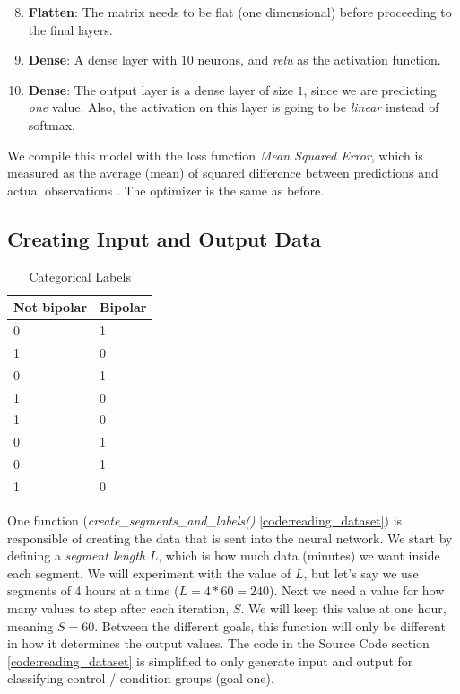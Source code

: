 \begin{enumerate}
      \setcounter{enumi}{7}
      \item \textbf{Flatten}: The matrix needs to be flat (one dimensional) before proceeding to the final layers.
      \item \textbf{Dense}: A dense layer with $10$ neurons, and \textit{relu} as the activation function. 
      \item \textbf{Dense}: The output layer is a dense layer of size $1$, since we are predicting \textit{one} value. 
            Also, the activation on this layer is going to be \textit{linear} instead of softmax.
\end{enumerate}

We compile this model with the loss function \textit{Mean Squared Error}, which is measured as the average (mean) 
of squared difference between predictions and actual observations \cite{loss_functions}. The optimizer is the same as before.

\subsection{Creating Input and Output Data}
\begin{table}
  \begin{center}
    \begin{tabular}{| l | l |}
      \hline
      \textbf{Not bipolar} & \textbf{Bipolar}  \\ \hline
      0                    &  1                \\ \hline
      1                    &  0                \\ \hline
      0                    &  1                \\ \hline
      1                    &  0                \\ \hline
      1                    &  0                \\ \hline
      0                    &  1                \\ \hline
      0                    &  1                \\ \hline
      1                    &  0                \\ \hline
    \end{tabular}
    \caption{Categorical Labels}
    \label{table:categorical_labels}
  \end{center}
\end{table}

One function (\textit{create\_segments\_and\_labels()} \ref{code:reading_dataset}) is responsible of creating the data that is sent into the neural network. 
We start by defining a \textit{segment length} $L$, which is how much data (minutes) we want inside each segment. We will experiment with the value of $L$, 
but let's say we use segments of 4 hours at a time ($L=4*60=240$). Next we need a value for how many values to step after each iteration, $S$. 
We will keep this value at one hour, meaning $S=60$. Between the different goals, this function will only be different in how it determines the output values.
The code in the Source Code section \ref{code:reading_dataset} is simplified to only generate input and output for 
classifying control / condition groups (goal one).

